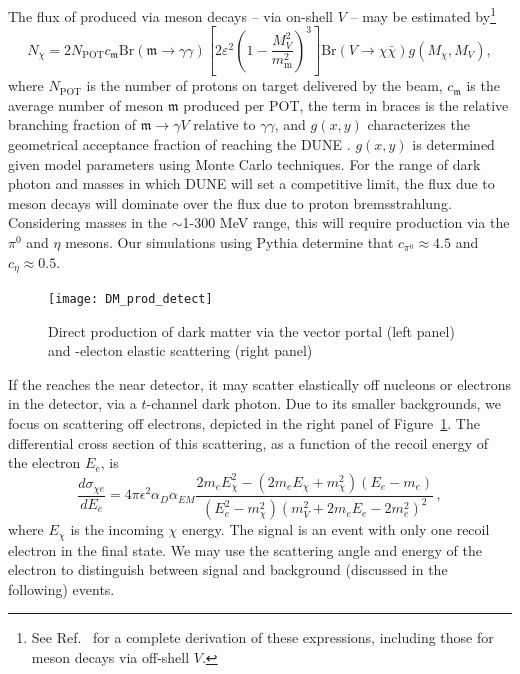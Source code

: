 The flux of  produced via meson decays -- via on-shell $V$ -- may be estimated by\footnote{See Ref.~\cite{DeRomeri:2019kic} for a complete derivation of these expressions, including those for meson decays via off-shell $V$.}
\begin{equation}
    N_\chi = 2 N_\mathrm{POT} c_\mathfrak{m} \mathrm{Br}(\mathfrak{m}\to \gamma\gamma) \left[ 2 \varepsilon^2 \left(1 - \frac{M_{V}^2}{m_\mathrm{m}^2}\right)^3\right] \mathrm{Br}(V \to \chi\bar{\chi}) g(M_\chi, M_{V}),
\end{equation}
where $N_\mathrm{POT}$ is the number of protons on target delivered by the beam, $c_\mathfrak{m}$ is the average number of meson $\mathfrak{m}$ produced per POT, the term in braces is the relative branching fraction of $\mathfrak{m} \to \gamma V$ relative to $\gamma\gamma$, and $g(x, y)$ characterizes the geometrical acceptance fraction of  reaching the DUNE . $g(x, y)$ is determined given model parameters using Monte Carlo techniques. For the range of dark photon and  masses in which DUNE will set a competitive limit, the  flux due to meson decays will dominate over the flux due to proton bremsstrahlung. Considering  masses in the $\sim$1-300 MeV range, this will require production via the $\pi^0$ and $\eta$ mesons. Our simulations using {\sc Pythia} determine that $c_{\pi^0} \approx 4.5$ and $c_\eta \approx 0.5$.

\begin{figure}[t]
\centering
\texttt{[image: DM\_prod\_detect]}
\caption[Direct production of  via the vector portal and -electon elastic scattering]{ 
Direct production of dark matter via the vector portal (left panel) and -electon elastic scattering (right panel)}
\label{fig:dm_prod}
\end{figure}

If the  reaches the near detector, it may scatter elastically off nucleons or electrons in the detector, via a $t$-channel dark photon. Due to its smaller backgrounds, we focus on scattering off electrons, depicted in the right panel of Figure~\ref{fig:dm_prod}. The differential cross section of this scattering, as a function of the recoil energy of the electron $E_e$, is
\begin{equation}
\frac{d\sigma_{{\chi}e}}{dE_{e}} 
= 4\pi \epsilon^{2}\alpha_D\alpha_{EM} \frac{2m_{e}E_{\chi}^{2} - (2m_{e}E_{\chi} + m_{\chi}^{2})(E_e-m_{e})}{(E_e^{2}-m_{\chi}^{2})(m_{V}^{2}+2m_{e}E_{e}-2m_{e}^{2})^{2}}\,,
\end{equation}
where $E_{\chi}$ is the incoming  $\chi$ energy. The signal is an event with only one recoil electron in the final state. We may use the scattering angle and energy of the electron to distinguish between signal and background (discussed in the following) events.

